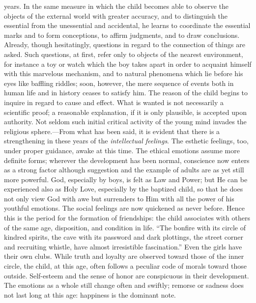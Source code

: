 years. In the same measure in which the child becomes able to observe the objects of the external world with greater accuracy, and to distinguish the essential from the unessential and accidental, he learns to coordinate the essential marks and to form conceptions, to affirm judgments, and to draw conclusions. Already, though hesitatingly, questions in regard to the connection of things are asked. Such questions, at first, refer only to objects of the nearest environment, for instance a toy or watch which the boy takes apart in order to acquaint himself with this marvelous mechanism, and to natural phenomena which lie before his eyes like baffling riddles; soon, however, the mere sequence of events both in human life and in history ceases to satisfy him. The reason of the child begins to inquire in regard to cause and effect. What is wanted is not necessarily a scientific proof; a reasonable explanation, if it is only plausible, is accepted upon authority. Not seldom such initial critical activity of the young mind invades the religious sphere.—From what has been said, it is evident that there is a strengthening in these years of the \emph{intellectual feelings}. The esthetic feelings, too, under proper guidance, awake at this time. The ethical emotions assume more definite forms; wherever the development has been normal, conscience now enters as a strong factor although suggestion and the example of adults are as yet still more powerful. God, especially by boys, is felt as Law and Power; but He can be experienced also as Holy Love, especially by the baptized child, so that he does not only view God with awe but surrenders to Him with all the power of his youthful emotions. The social feelings are now quickened as never before. Hence this is the period for the formation of friendships: the child associates with others of the same age, disposition, and condition in life. “The bonfire with its circle of kindred spirits, the cave with its password and dark plottings, the street corner
and recruiting whistle, have almost irresistible fascination.” Even the girls have their own clubs. While truth and loyalty are observed toward those of the inner circle, the child, at this age, often follows a peculiar code of morals toward those outside. Self-esteem and the sense of honor are conspicuous in their development. The emotions as a whole still change often and swiftly; remorse or sadness does not last long at this age: happiness is the dominant note.

